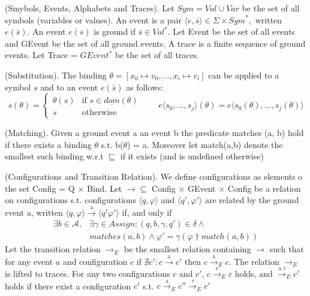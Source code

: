 				\begin{dfn}
					(Smybols, Events, Alphabets and Traces).
					Let $\mathit{Sym} = \mathit{Val} \cup \mathit{Var}$ be the set of all symbols (variables or values).
					An event is a pair $\langle e, \overline{s} \rangle \in \Sigma \times \mathit{Sym}^\ast,$ written $e(\overline{s})$.
					An event $e(\overline{s})$ is ground if $\overline{s} \in \mathit{Val}^\ast$.
					Let Event be the set of all events and GEvent be the set of all ground events.
					A trace is a finite sequence of ground events.
					Let Trace = $GEvent^\ast$ be the set of all traces\citep{qea}. 
				\end{dfn}
				
				\begin{dfn}
					(Substitution).
					The binding $\theta = [x_0 \mapsto v_0, \dots, x_i \mapsto v_i]$ can be applied to a symbol $s$ and to an event
					$e(\overline{s})$ as follows: 
					\[
					 s(\theta) = 
					  \begin{cases} 
					   \theta(s) & \text{if } s \in \underline{dom}(\theta) \\
					   s & \text{otherwise}
					  \end{cases}
					  \qquad e \langle s_0,\ldots,s_j \rangle (\theta) = e \langle s_0(\theta),\ldots,s_j(\theta) \rangle
					\]
				\end{dfn}
				
				\begin{dfn}
					(Matching).
					Given a ground event a an event b the predicate matches (a, b) hold if there exists a binding $\theta$ s.t. b($\theta$) = a.
					Moreover let match(a,b) denote the smallest such binding w.r.t $\sqsubseteq$ if it exists (and is undefined otherwise)
				\end{dfn}
				
				\begin{dfn}
					(Configurations and Transition Relation).
					We define configurations as elements o the set Config = Q $\times$ Bind. Let $\rightarrow \subseteq$ Config $\times$ GEvent $\times$ Config be a relation on
					configurations s.t. configurations $\langle q, \varphi \rangle$ and $\langle q', \varphi' \rangle$ are related by the ground event a, written
					$\langle q, \varphi \rangle \xrightarrow{\text{a}} \langle q' \varphi' \rangle$ if, and only if
						\begin{align}
							\exists b \in \mathcal{A}, & \exists \gamma \in Assign : (q, b, \gamma, q') \in \delta \wedge \\
							&matches(a,b) \wedge \varphi' = \gamma(\varphi \dagger match(a,b))
						\end{align}
					Let the transition relation $\rightarrow_{E}$ be the smallest relation containing $\rightarrow$ such that for any event
					$a$ and configuration $c$ if $\nexists c' : c \xrightarrow{\text{a}} c'$ then $ c \xrightarrow{\text{a}}_E c$.
					The relation $\rightarrow_E$ is lifted to traces.
					For any two configurations $c$ and $c'$, $ c \xrightarrow{\text{$\epsilon$}}_E c$ holds, and $\xrightarrow{\text{a.$\tau$}}_E c'$ holds
					if there exist a configuration $c'$ s.t. $c \xrightarrow{\text{a}}_E c'' \xrightarrow{\text{$\tau$}}_E c'$
				\end{dfn}
				
